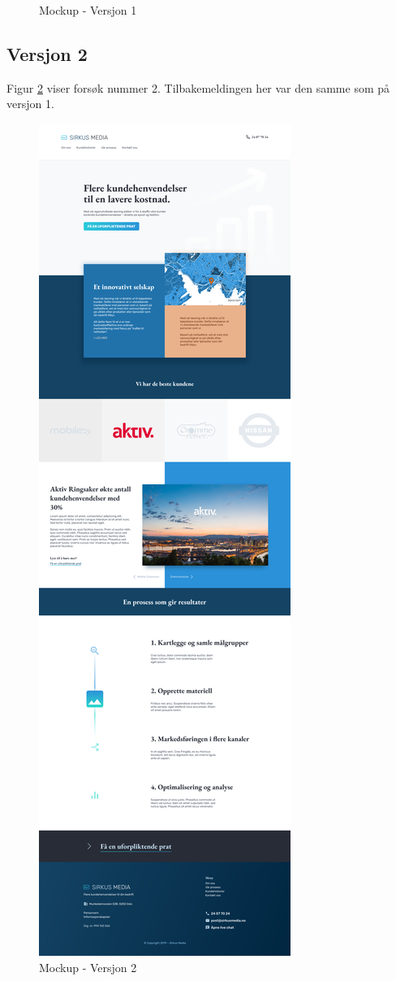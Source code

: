 \begin{figure}[H]
    \caption{Mockup - Versjon 1}
    \label{fig:mockup-v1}
\end{figure}

\subsection{Versjon 2}
Figur \ref{fig:mockup-v2} viser forsøk nummer 2. Tilbakemeldingen her var den samme som på versjon 1.
\begin{figure}[H]
    \centering
    \includegraphics[height=.85\textheight]{design/mockup2-draft3.png}
    \caption{Mockup - Versjon 2}
    \label{fig:mockup-v2}
\end{figure}

